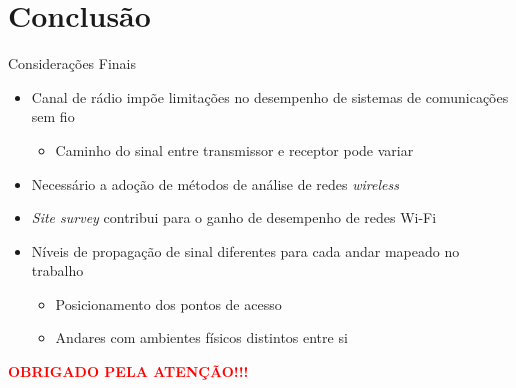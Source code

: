\documentclass[aspectratio=169,12pt]{beamer}
\begin{document}
\section{Conclusão}
\begin{frame}{Considerações Finais}
	\begin{block}{}
		\begin{itemize}
			\item Canal de rádio impõe limitações no desempenho de sistemas de comunicações sem fio
				\begin{itemize}
					\item Caminho do sinal entre transmissor e receptor pode variar
				\end{itemize}
			\item Necessário a adoção de métodos de análise de redes \textit{wireless}
			\item \textit{Site survey} contribui para o ganho de desempenho de redes Wi-Fi
			\item Níveis de propagação de sinal diferentes para cada andar mapeado no trabalho
			\begin{itemize}
				\item Posicionamento dos pontos de acesso
				\item Andares com ambientes físicos distintos entre si
			\end{itemize}
		\end{itemize}
	\end{block}
\end{frame}
\begin{frame}[plain,c]
	\vfill
	\centering
	{\huge\textcolor{red}{\textbf{OBRIGADO PELA ATENÇÃO!!!}}}
	\vfill
\end{frame}
%		
\end{document}
